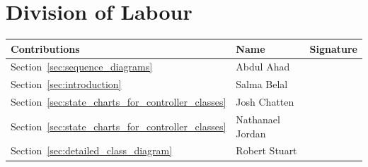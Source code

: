 \documentclass[titlepage,12pt]{article}
\begin{document}

\newpage
\appendix
\section{Division of Labour}
\label{sec:division_of_labour}

\begin{table}[H]
\vspace{-0.06in}
\begin{center}
\setlength{\extrarowheight}{4.0pt}
\begin{tabular}{m{} m{} m{}} 
\hline
\textbf{Contributions} & \textbf{Name} & \textbf{Signature}\\
\hline
Section~\ref{sec:sequence_diagrams} & Abdul Ahad & \\
\hline
Section~\ref{sec:introduction} & Salma Belal & \\
\hline
Section~\ref{sec:state_charts_for_controller_classes} & Josh Chatten & \\
\hline
Section~\ref{sec:state_charts_for_controller_classes} & Nathanael Jordan  & \\
\hline
Section~\ref{sec:detailed_class_diagram} & Robert Stuart & \\
\hline
\end{tabular}
\end{center}
\label{divOfLabour}
\end{table}

\end{document}
